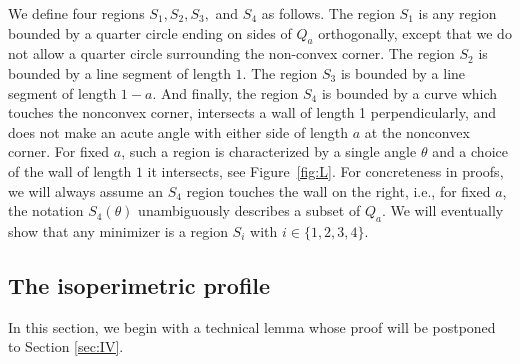 \documentclass[leqno]{article}
\numberwithin{equation}{section}
\theoremstyle{definition}
\theoremstyle{remark}
\theoremstyle{plain}
\begin{document}
We define four regions $S_1,S_2,S_3,$ and $S_4$ as follows.   The region $S_1$ is any region bounded by a quarter circle ending on sides of $Q_a$ orthogonally, except that we do not allow a quarter circle surrounding the non-convex corner.  The region $S_2$ is bounded by a line segment of length $1$.  The region $S_3$ is bounded by a line segment of length $1-a$.  And finally, the region $S_4$ is bounded by a curve which touches the nonconvex corner, intersects a wall of length 1 perpendicularly, and does not make an acute angle with either side of length $a$ at the nonconvex corner. For fixed $a$, such a region is characterized by a single angle $\theta$ and a choice of the wall of length $1$ it intersects, see Figure~\ref{fig:L}.  For concreteness in proofs, we will always assume an $S_4$ region touches the wall on the right, i.e., for fixed $a$, the notation $S_4(\theta)$ unambiguously describes a subset of $Q_a$.  We will eventually show that any minimizer is a region $S_i$ with $i\in \{1,2,3,4\}$.

\subsection{The isoperimetric profile}\label{sec:fat}

In this section, we begin with a technical lemma whose proof will be postponed to Section \ref{sec:IV}.
\end{document}
